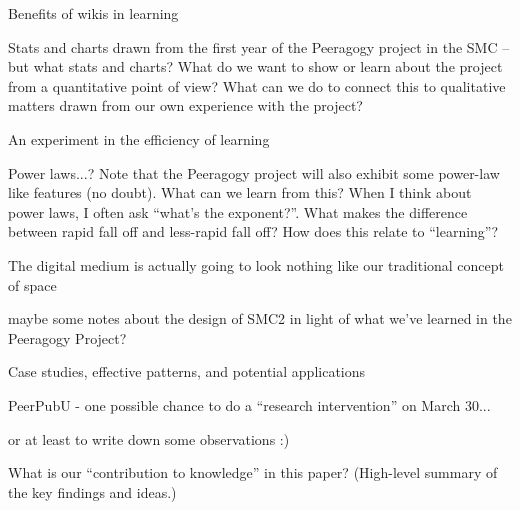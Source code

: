 \documentclass{acm_proc_article-sp}
\begin{document}
    Benefits of wikis in learning

        Stats and charts drawn from the first year of the Peeragogy project in the SMC -- but what stats and charts? What do we want to show or learn about the project from a quantitative point of view? What can we do to connect this to qualitative matters drawn from our own experience with the project?

    An experiment in the efficiency of learning

        Power laws...? Note that the Peeragogy project will also exhibit some power-law like features (no doubt). What can we learn from this? When I think about power laws, I often ask ``what's the exponent?''. What makes the difference between rapid fall off and less-rapid fall off? How does this relate to ``learning''?

    The digital medium is actually going to look nothing like our traditional concept of space

        maybe some notes about the design of SMC2 in light of what we've learned in the Peeragogy Project? 

    Case studies, effective patterns, and potential applications

        PeerPubU - one possible chance to do a ``research intervention'' on March 30...

        or at least to write down some observations :)

        What is our ``contribution to knowledge'' in this paper? (High-level summary of the key findings and ideas.)\cite{paragogy}
\cite{Origins}
\cite{Tales}
\cite{Peeragogy-2}
\cite{College}
\cite{Bridges}
\cite{peer}
\cite{Gluing}
\cite{GroupInformatics}
\cite{Why}
\cite{PeeragogyinAction}

%

\end{document}
